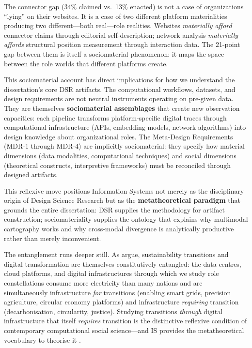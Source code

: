 \documentclass[../main.tex]{subfiles}
\begin{document}
\begin{insightbox}
The connector gap (34\% claimed vs.\ 13\% enacted) is not a case of organizations ``lying'' on their websites. It is a case of two different platform materialities producing two different---both real---role realities. Websites \emph{materially afford} connector claims through editorial self-description; network analysis \emph{materially affords} structural position measurement through interaction data. The 21-point gap between them is itself a sociomaterial phenomenon: it maps the space between the role worlds that different platforms create.
\end{insightbox}

This sociomaterial account has direct implications for how we understand the dissertation's core DSR artifacts. The \RoleBox{} computational workflows, datasets, and design requirements are not neutral instruments operating on pre-given data. They are themselves \textbf{sociomaterial assemblages} that create new observation capacities: each pipeline transforms platform-specific digital traces through computational infrastructure (APIs, embedding models, network algorithms) into design knowledge about organizational roles. The Meta-Design Requirements (MDR-1 through MDR-4) are implicitly sociomaterial: they specify how material dimensions (data modalities, computational techniques) and social dimensions (theoretical constructs, interpretive frameworks) must be reconciled through designed artifacts.

This reflexive move positions Information Systems not merely as the disciplinary origin of Design Science Research but as the \textbf{metatheoretical paradigm} that grounds the entire dissertation: DSR supplies the methodology for artifact construction; sociomateriality supplies the ontology that explains why multimodal cartography works and why cross-modal divergence is analytically productive rather than merely inconvenient.

The entanglement runs deeper still. As \textcite{owoyele2025datacentering} argue, sustainability transitions and digital transformation are themselves constitutively entangled: the data centres, cloud platforms, and digital infrastructures through which we study role constellations consume more electricity than many nations and are simultaneously infrastructure \emph{for} transitions (enabling smart grids, precision agriculture, circular economy platforms) and infrastructure \emph{requiring} transition (decarbonisation, circularity, justice). Studying transitions \emph{through} digital infrastructure that itself \emph{requires} transition is the distinctive reflexive condition of contemporary computational social science---and IS provides the metatheoretical vocabulary to theorise it \cite{cecezkecmanovic2014sociomateriality,plantin2018infrastructure}.
\end{document}
